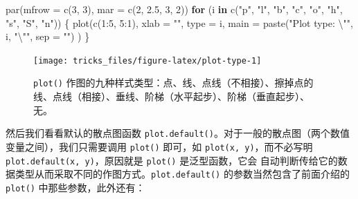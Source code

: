 \documentclass[
  b5paper,
  UTF8,twoside]{book}
\newenvironment{Shaded}{\begin{snugshade}}{\end{snugshade}}
\newcommand{\AttributeTok}[1]{\textcolor[rgb]{0.77,0.63,0.00}{#1}}
\newcommand{\ControlFlowTok}[1]{\textcolor[rgb]{0.13,0.29,0.53}{\textbf{#1}}}
\newcommand{\DecValTok}[1]{\textcolor[rgb]{0.00,0.00,0.81}{#1}}
\newcommand{\FloatTok}[1]{\textcolor[rgb]{0.00,0.00,0.81}{#1}}
\newcommand{\FunctionTok}[1]{\textcolor[rgb]{0.00,0.00,0.00}{#1}}
\newcommand{\NormalTok}[1]{#1}
\newcommand{\SpecialCharTok}[1]{\textcolor[rgb]{0.00,0.00,0.00}{#1}}
\newcommand{\StringTok}[1]{\textcolor[rgb]{0.31,0.60,0.02}{#1}}
\begin{document}
\begin{Shaded}
\begin{Highlighting}[]
\FunctionTok{par}\NormalTok{(}\AttributeTok{mfrow =} \FunctionTok{c}\NormalTok{(}\DecValTok{3}\NormalTok{, }\DecValTok{3}\NormalTok{), }\AttributeTok{mar =} \FunctionTok{c}\NormalTok{(}\DecValTok{2}\NormalTok{, }\FloatTok{2.5}\NormalTok{, }\DecValTok{3}\NormalTok{, }\DecValTok{2}\NormalTok{))}
\ControlFlowTok{for}\NormalTok{ (i }\ControlFlowTok{in} \FunctionTok{c}\NormalTok{(}\StringTok{"p"}\NormalTok{, }\StringTok{"l"}\NormalTok{, }\StringTok{"b"}\NormalTok{, }\StringTok{"c"}\NormalTok{, }\StringTok{"o"}\NormalTok{, }\StringTok{"h"}\NormalTok{, }\StringTok{"s"}\NormalTok{, }\StringTok{"S"}\NormalTok{, }\StringTok{"n"}\NormalTok{)) \{}
  \FunctionTok{plot}\NormalTok{(}\FunctionTok{c}\NormalTok{(}\DecValTok{1}\SpecialCharTok{:}\DecValTok{5}\NormalTok{, }\DecValTok{5}\SpecialCharTok{:}\DecValTok{1}\NormalTok{), }\AttributeTok{xlab =} \StringTok{""}\NormalTok{, }\AttributeTok{type =}\NormalTok{ i,}
    \AttributeTok{main =} \FunctionTok{paste}\NormalTok{(}\StringTok{"Plot type: }\SpecialCharTok{\textbackslash{}"}\StringTok{"}\NormalTok{, i, }\StringTok{"}\SpecialCharTok{\textbackslash{}"}\StringTok{"}\NormalTok{, }\AttributeTok{sep =} \StringTok{""}\NormalTok{)}
\NormalTok{  )}
\NormalTok{\}}
\end{Highlighting}
\end{Shaded}

\begin{figure}

{\centering \texttt{[image: tricks\_files/figure-latex/plot-type-1]} 

}

\caption[\texttt{plot()} 作图的九种样式]{\texttt{plot()} 作图的九种样式类型：点、线、点线（不相接）、擦掉点的线、点线（相接）、垂线、阶梯（水平起步）、阶梯（垂直起步）、无。}\label{fig:plot-type}
\end{figure}





然后我们看看默认的散点图函数 \texttt{plot.default()}。对于一般的散点图（两个数值变量之间），我们只需要调用 \texttt{plot()} 即可，如 \texttt{plot(x,\ y)}，而不必写明 \texttt{plot.default(x,\ y)}，原因就是 \texttt{plot()} 是泛型函数，它会 自动判断传给它的数据类型从而采取不同的作图方式。\texttt{plot.default()} 的参数当然包含了前面介绍的 \texttt{plot()} 中那些参数，此外还有：
\end{document}
